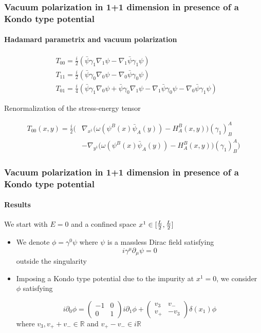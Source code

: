 \documentclass[french]{beamer}
\begin{document}
\begin{frame}
\frametitle{Vacuum polarization in 1+1 dimension in presence of a Kondo type potential}
\framesubtitle{Hadamard parametrix and vacuum polarization}

\begin{equation*}
\begin{split}
& T_{00} = \frac{i}{2} (\bar{\psi} \gamma_1 \nabla_1 \psi - \nabla_1 \bar{\psi}\gamma_1 \psi)  \\
& T_{11} = \frac{i}{2} (\bar{\psi} \gamma_0 \nabla_0 \psi - \nabla_0 \bar{\psi}\gamma_0 \psi)  \\
& T_{01} = \frac{i}{4} (\bar{\psi} \gamma_1 \nabla_0 \psi +\bar{\psi} \gamma_0 \nabla_1 \psi - \nabla_1 \bar{\psi}\gamma_0 \psi - \nabla_0 \bar{\psi}\gamma_1 \psi)  
\end{split}
\end{equation*}

Renormalization of the stress-energy tensor

\begin{equation*}
\begin{split}
T_{00}(x,y) = 
\frac{i}{2}\Big( & 
\nabla_{x^1}\big(\omega(  \psi^B(x) \bar{\psi}_A(y))-H^B_A(x,y)\big)(\gamma_1)^A_B \\
& - \nabla_{y^1}\Big(\omega( \psi^B(x)  \bar{\psi}_A(y)) - H^B_A(x,y)\big)(\gamma_1)^A_B \Big)   
\end{split}
\end{equation*}


\end{frame}
\begin{frame}[shrink=10]
\frametitle{Vacuum polarization in 1+1 dimension in presence of a Kondo type potential}
\framesubtitle{Results}

We start with $E = 0$ and a confined space $x^1 \in [\-\frac L 2 , \frac L 2]$
\begin{itemize}
\item We denote $\phi = \gamma^0\psi$ where $\psi$ is a massless Dirac field satisfying 
\begin{equation*}
i\gamma^\mu\partial_\mu \psi = 0
\end{equation*}
outside the singularity
\item Imposing a Kondo type potential due to the impurity at $x^1 = 0$,
we consider $\phi$ satisfying

\begin{equation*}
i \partial_0 \phi = 
\begin{pmatrix} 
-1 & 0 \\
0 & 1 
\end{pmatrix} i \partial_1 \phi +
\begin{pmatrix}
v_3 & v_- \\
v_+ & -v_3
\end{pmatrix} \delta(x_1) \phi
\end{equation*}
where $v_3, v_+ + v_- \in \mathbb{R}$ and $ v_+ - v_-\in i \mathbb{R}$
\end{itemize}

\end{frame}
\end{document}
